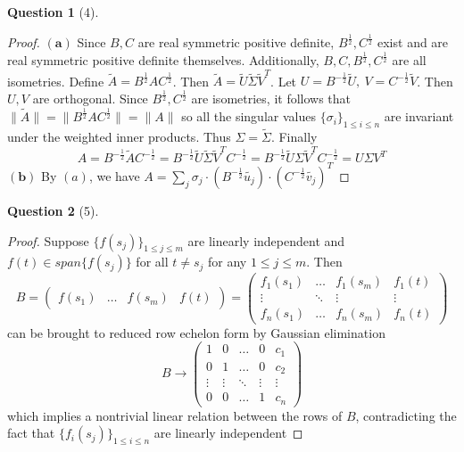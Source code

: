 \documentclass[11pt]{article}
\theoremstyle{quest}
\newtheorem*{question}{Question}
\begin{document}
\begin{question}[4]
\end{question}
\begin{proof}
$\mathbf{(a)}$ Since $B, C$ are real symmetric positive definite, $B^{\frac{1}{2}}, C^{\frac{1}{2}}$ exist and are real symmetric positive definite themselves. Additionally, $B, C, B^{\frac{1}{2}}, C^{\frac{1}{2}}$ are all isometries. Define $\tilde{A} = B^{\frac{1}{2}} A C^{\frac{1}{2}}$. Then $\tilde{A} = \tilde{U}  \tilde{\Sigma} \tilde{V}^T$. Let $U = B^{-\frac{1}{2}} \tilde{U},\ V = C^{-\frac{1}{2}} \tilde{V}$. Then $U, V$ are orthogonal. Since $B^{\frac{1}{2}}, C^{\frac{1}{2}}$ are isometries, it follows that $\|\tilde{A}\| = \|B^{\frac{1}{2}} A C^{\frac{1}{2}}\| = \|A\|$ so all the singular values $\{\sigma_i\}_{1 \le i \le n}$ are invariant under the weighted inner products. Thus $\Sigma = \tilde{\Sigma}$. Finally
$$A = B^{-\frac{1}{2}} \tilde{A} C^{-\frac{1}{2}} = B^{-\frac{1}{2}} \tilde{U}  \tilde{\Sigma} \tilde{V}^T C^{-\frac{1}{2}} = B^{-\frac{1}{2}} \tilde{U}  \Sigma \tilde{V}^T C^{-\frac{1}{2}} = U \Sigma V^T$$
$\mathbf{(b)}$ By $(a)$, we have $A = \sum_j \sigma_j \cdot (B^{-\frac{1}{2}} \tilde{u_j}) \cdot (C^{-\frac{1}{2}} \tilde{v_j})^T$
\end{proof}

\begin{question}[5]
\end{question}
\begin{proof}
Suppose $\{f(s_j)\}_{1 \le j \le m}$ are linearly independent and $f(t) \in span\{f(s_j)\}$ for all $t \ne s_j$ for any $1 \le j \le m$. Then
$$B = \begin{pmatrix}
f(s_1) & \ldots & f(s_m) & f(t)
\end{pmatrix} = \begin{pmatrix}
f_1(s_1) & \ldots & f_1(s_m) & f_1(t) \\
\vdots & \ddots & \vdots & \vdots \\
f_n(s_1) & \ldots & f_n(s_m) & f_n(t)
\end{pmatrix}$$
can be brought to reduced row echelon form by Gaussian elimination
$$B \rightarrow \begin{pmatrix}
1 & 0 & \ldots & 0 & c_1 \\
0 & 1 & \ldots & 0 & c_2\\
\vdots & \vdots & \ddots & \vdots & \vdots \\
0 & 0 & \ldots & 1 & c_n
\end{pmatrix}$$
which implies a nontrivial linear relation between the rows of $B$, contradicting the fact that $\{f_i(s_j)\}_{1 \le i \le n}$ are linearly independent
\end{proof}
\end{document}
